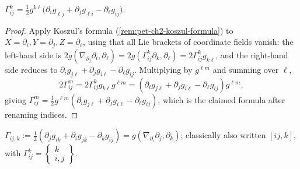 \begin{proposition}
  \label{prop:pet-ch2-christoffel-formula}
  \leanok
  $\displaystyle\Gamma^k_{ij}=\tfrac12g^{k\ell}\big(\partial_ig_{\ell j}+\partial_jg_{\ell i}-\partial_\ell g_{ij}\big)$.
\end{proposition}
\begin{proof}
  \leanok
  Apply Koszul's formula (\cref{rem:pet-ch2-koszul-formula}) to
  $X=\partial_i,Y=\partial_j,Z=\partial_\ell$, using that all Lie brackets of
  coordinate fields vanish: the left-hand side is
  $2g(\nabla_{\partial_j}\partial_i,\partial_\ell)=2g(\Gamma^k_{ij}\partial_k,\partial_\ell)=2\Gamma^k_{ij}g_{k\ell}$,
  and the right-hand side reduces to
  $\partial_ig_{j\ell}+\partial_jg_{i\ell}-\partial_\ell g_{ij}$. Multiplying by
  $g^{\ell m}$ and summing over $\ell$,
  \[
    2\Gamma^m_{ij}=2\Gamma^k_{ij}g_{k\ell}g^{\ell m}=(\partial_ig_{j\ell}+\partial_jg_{i\ell}-\partial_\ell g_{ij})g^{\ell m},
  \]
  giving $\Gamma^m_{ij}=\tfrac12g^{\ell m}(\partial_ig_{j\ell}+\partial_jg_{i\ell}-\partial_\ell g_{ij})$, which is the
  claimed formula after renaming indices.
\end{proof}

\begin{definition}
  \label{def:pet-ch2-christoffel-symbols-first-kind}
  \leanok
  $\Gamma_{ij,k}:=\tfrac12(\partial_jg_{ik}+\partial_ig_{jk}-\partial_kg_{ij})=g(\nabla_{\partial_i}\partial_j,\partial_k)$;
  classically also written $[ij,k]$, with $\Gamma^k_{ij}=\begin{Bmatrix}k\\i,j\end{Bmatrix}$.
\end{definition}

